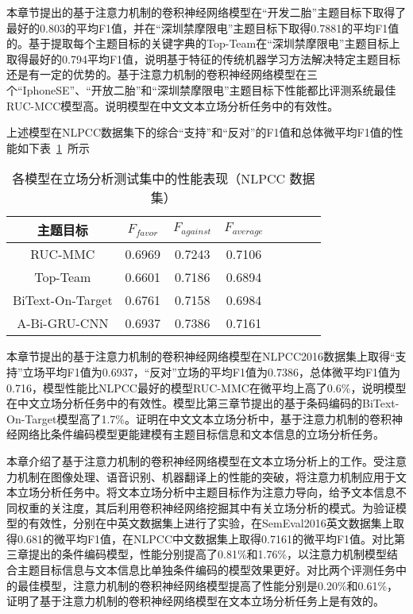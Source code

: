 本章节提出的基于注意力机制的卷积神经网络模型在“开发二胎”主题目标下取得了最好的0.803的平均F1值，并在“深圳禁摩限电”主题目标下取得0.7881的平均F1值的。基于提取每个主题目标的关键字典的Top-Team在“深圳禁摩限电”主题目标上取得最好的0.794平均F1值，说明基于特征的传统机器学习方法解决特定主题目标还是有一定的优势的。基于注意力机制的卷积神经网络模型在三个“IphoneSE”、“开放二胎”和“深圳禁摩限电”主题目标下性能都比评测系统最佳RUC-MCC模型高。说明模型在中文文本立场分析任务中的有效性。

上述模型在NLPCC数据集下的综合“支持”和“反对”的F1值和总体微平均F1值的性能如下表~\ref{nlpcc_res_attention}~所示
\begin{table}[htbp]
	\caption[table123]{各模型在立场分析测试集中的性能表现（NLPCC 数据集）}
	\label{nlpcc_res_attention}
	\vspace{0.5em}\centering\wuhao
	\begin{tabular}{cccccccc}
		\toprule[1.5pt]
		主题目标& $F_{favor}$&$F_{against}$&$F_{average}$ \\
		\midrule[1pt]
		RUC-MMC&0.6969&0.7243&0.7106\\
		Top-Team&0.6601&0.7186&0.6894\\
		BiText-On-Target&0.6761&0.7158&0.6984\\
		A-Bi-GRU-CNN&0.6937&0.7386&0.7161\\
		\bottomrule[1.5pt]
	\end{tabular}
\end{table}

本章节提出的基于注意力机制的卷积神经网络模型在NLPCC2016数据集上取得“支持”立场平均F1值为0.6937，“反对”立场的平均F1值为0.7386，总体微平均F1值为0.716，模型性能比NLPCC最好的模型RUC-MMC在微平均上高了0.6\%，说明模型在中文立场分析任务中的有效性。模型比第三章节提出的基于条码编码的BiText-On-Target模型高了1.7\%。证明在中文文本立场分析中，基于注意力机制的卷积神经网络比条件编码模型更能建模有主题目标信息和文本信息的立场分析任务。



本章介绍了基于注意力机制的卷积神经网络模型在文本立场分析上的工作。受注意力机制在图像处理、语音识别、机器翻译上的性能的突破，将注意力机制应用于文本立场分析任务中。将文本立场分析中主题目标作为注意力导向，给予文本信息不同权重的关注度，其后利用卷积神经网络挖掘其中有关立场分析的模式。为验证模型的有效性，分别在中英文数据集上进行了实验，在SemEval2016英文数据集上取得0.681的微平均F1值，在NLPCC中文数据集上取得0.7161的微平均F1值。对比第三章提出的条件编码模型，性能分别提高了0.81\%和1.76\%，以注意力机制模型结合主题目标信息与文本信息比单独条件编码的模型效果更好。对比两个评测任务中的最佳模型，注意力机制的卷积神经网络模型提高了性能分别是0.20\%和0.61\%，证明了基于注意力机制的卷积神经网络模型在文本立场分析任务上是有效的。




